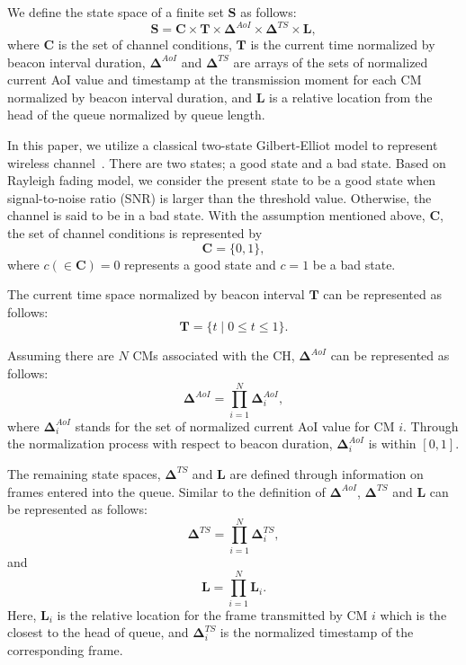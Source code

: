 \documentclass[journal]{IEEEtran}
\begin{document}
We define the state space of a finite set $\mathbf{S}$ as follows:
\begin{equation}
    \mathbf{S} = \mathbf{C}
    \times \mathbf{T}
    \times \mathbf{\Delta}^{AoI}
    \times \mathbf{\Delta}^{TS}
    \times \mathbf{L},
\label{eq:S}
\end{equation}
where $\mathbf{C}$ is the set of channel conditions, $\mathbf{T}$ is the current time normalized by beacon interval duration, $\mathbf{\Delta}^{AoI}$ and $\mathbf{\Delta}^{TS}$ are arrays of the sets of normalized current AoI value and timestamp at the transmission moment for each CM normalized by beacon interval duration, and $\mathbf{L}$ is a relative location from the head of the queue normalized by queue length.

In this paper, we utilize a classical two-state Gilbert-Elliot model to represent wireless channel~\cite{Zhang1999,Boujemaa2005}. There are two states; a good state and a bad state. Based on Rayleigh fading model, we consider the present state to be a good state when signal-to-noise ratio (SNR) is larger than the threshold value. Otherwise, the channel is said to be in a bad state. With the assumption mentioned above, $\mathbf{C}$, the set of channel conditions is represented by
\begin{equation}
    \mathbf{C} = \{0, 1\},
\label{eq:C}
\end{equation}
where $c(\in \mathbf{C})=0$ represents a good state and $c=1$ be a bad state. 

The current time space normalized by beacon interval $\mathbf{T}$ can be represented as follows:
\begin{equation}
    \mathbf{T} = \{t \mid 0 \leq t \leq 1 \}.
\label{eq:t}
\end{equation}

Assuming there are $N$ CMs associated with the CH, $\mathbf{\Delta}^{AoI}$ can be represented as follows:
\begin{equation}
    \mathbf{\Delta}^{AoI} = \prod_{i=1}^{N} \mathbf{\Delta}^{AoI}_{i},
\label{eq:delta1}
\end{equation}
where $\mathbf{\Delta}^{AoI}_{i}$ stands for the set of normalized current AoI value for CM $i$. Through the normalization process with respect to beacon duration, $\mathbf{\Delta}^{AoI}_{i}$ is within $[0, 1]$.

The remaining state spaces, $\mathbf{\Delta}^{TS}$ and $\mathbf{L}$ are defined through information on frames entered into the queue. Similar to the definition of $\mathbf{\Delta}^{AoI}$, $\mathbf{\Delta}^{TS}$ and $\mathbf{L}$ can be represented as follows:
\begin{equation}
    \mathbf{\Delta}^{TS} = \prod_{i=1}^{N} \mathbf{\Delta}^{TS}_{i},
\label{eq:delta2}
\end{equation}
and
\begin{equation}
    \mathbf{L} = \prod_{i=1}^{N} \mathbf{L}_i.
\label{eq:l}
\end{equation}
Here, $\mathbf{L}_i$ is the relative location for the frame transmitted by CM $i$ which is the closest to the head of queue, and $\mathbf{\Delta}^{TS}_{i}$ is the normalized timestamp of the corresponding frame. 
\end{document}
